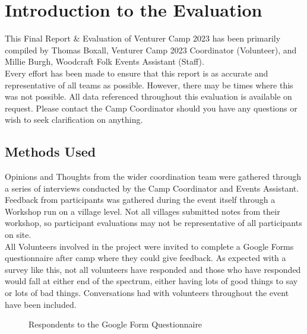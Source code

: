 \chapter{Introduction to the Evaluation}
This Final Report \& Evaluation of Venturer Camp 2023 has been primarily compiled by Thomas Boxall, Venturer Camp 2023 Coordinator (Volunteer), and Millie Burgh, Woodcraft Folk Events Assistant (Staff).\\

Every effort has been made to ensure that this report is as accurate and representative of all teams as possible. However, there may be times where this was not possible. All data referenced throughout this evaluation is available on request. Please contact the Camp Coordinator should you have any questions or wish to seek clarification on anything.

\section{Methods Used}
Opinions and Thoughts from the wider coordination team were gathered through a series of interviews conducted by the Camp Coordinator and Events Assistant. \\

Feedback from participants was gathered during the event itself through a Workshop run on a village level. Not all villages submitted notes from their workshop, so participant evaluations may not be representative of all participants on site. \\

All Volunteers involved in the project were invited to complete a Google Forms questionnaire after camp where they could give feedback. As expected with a survey like this, not all volunteers have responded and those who have responded would fall at either end of the spectrum, either having lots of good things to say or lots of bad things. Conversations had with volunteers throughout the event have been included.
\begin{figure}[h]
    \centering
    \caption{Respondents to the Google Form Questionnaire}
    
\end{figure}

